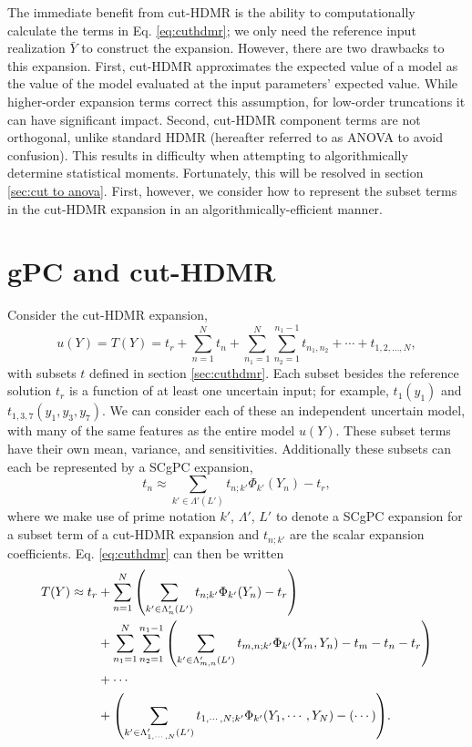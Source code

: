 The immediate benefit from cut-HDMR is the ability to computationally calculate the terms in Eq.
\ref{eq:cuthdmr};
we only need the reference input realization $\bar Y$ to construct the expansion.  However, there are two
drawbacks to this expansion.  First, cut-HDMR approximates the expected value of a model as the value of the
model evaluated at the input parameters' expected value.  While higher-order expansion terms correct this
assumption, for low-order truncations it can have significant impact.
Second,
cut-HDMR component terms are not orthogonal, unlike standard HDMR (hereafter referred to as ANOVA to avoid
confusion).  This results in difficulty
when attempting to algorithmically determine statistical moments.  Fortunately, this will be resolved in
section \ref{sec:cut to anova}.  First, however, we consider how to represent the subset terms in the cut-HDMR
expansion in an algorithmically-efficient manner.

\section{gPC and cut-HDMR}\label{sec:gPC cut}
Consider the cut-HDMR expansion,
\begin{equation}
  u(Y) = T(Y) = t_r + \sum_{n=1}^N t_n + \sum_{n_1=1}^N \sum_{n_2=1}^{n_1-1}
  t_{n_1,n_2}+\cdots+t_{1,2,\ldots,N},
\end{equation}
with subsets $t$ defined in section \ref{sec:cuthdmr}. Each subset besides the reference solution $t_r$ is a
function of at least one uncertain input; for example, $t_1(y_1)$ and $t_{1,3,7}(y_1,y_3,y_7)$.  We can
consider each of these an independent uncertain model, with many of the same features as the entire model
$u(Y)$.  These subset terms have their own mean, variance, and sensitivities.  Additionally
these subsets can each be represented by a SCgPC expansion,
\begin{equation}
  t_n \approx \sum_{k'\in\Lambda'(L')} t_{n;k'}\Phi_{k'}(Y_n) - t_r,
\end{equation}
where we make use of prime notation $k'$, $\Lambda'$, $L'$ to denote a SCgPC expansion
for a subset term of a cut-HDMR expansion and $t_{n;k'}$ are the scalar expansion coefficients.  Eq.
\ref{eq:cuthdmr} can then be written
\begin{align}\label{eq:cut and gpc}
  T(Y) \approx t_r &+ \sum_{n=1}^N \qty(\sum_{k'\in\Lambda_n'(L')} t_{n;k'}\Phi_{k'}(Y_n)-t_r) \\ \nonumber
  &+ \sum_{n_1=1}^N \sum_{n_2=1}^{n_1-1} \qty(\sum_{k'\in\Lambda_{m,n}'(L')} t_{m,n;k'}\Phi_{k'}(Y_m,Y_n)
-t_m -t_n - t_r)\\
  \nonumber &+\cdots \\ \nonumber
  &+ \qty(\sum_{k'\in\Lambda_{1,\cdots,N}'(L')} t_{1,\cdots,N;k'}\Phi_{k'}(Y_1,\cdots,Y_N) - (\cdots)).
\end{align}

